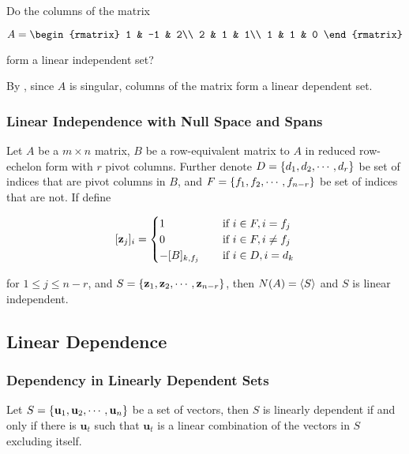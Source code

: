 \documentclass[a4paper,12pt]{article}
\begin{document}
\begin{exm}
  Do the columns of the matrix

  $$A=\begin{rmatrix}
    1 & -1 & 2\\
    2 & 1 & 1\\
    1 & 1 & 0
  \end{rmatrix}$$\s

  form a linear independent set?\n

  \ans By \rthm[\sctd{2}], since $A$ is singular, columns of the matrix form a linear dependent set.
\end{exm}

\subsubsection{Linear Independence with Null Space and Spans}
\begin{thm}
  Let $A$ be a $m\times n$ matrix, $B$ be a row-equivalent matrix to $A$ in reduced row-echelon form with $r$ pivot columns. Further denote $D=\left\{ d_{1},d_{2},\cdots,d_{r}\right\}$ be set of indices that are pivot columns in $B$, and $F=\left\{ f_{1},f_{2},\cdots,f_{n-r}\right\}$ be set of indices that are not. If define

  $$[\mathbf{z}_{j}]_{i}=\begin{cases}
    1&\;\;\;\;\text{if }i\in F,i=f_{j}\\
    0&\;\;\;\;\text{if }i\in F,i\neq f_{j}\\
    -[B]_{k,f_{j}}&\;\;\;\;\text{if }i\in D,i=d_{k}
  \end{cases}$$\s

  for $1\leq j\leq n-r$, and $S=\left\{ \mathbf{z}_{1},\mathbf{z}_{2},\cdots,\mathbf{z}_{n-r}\right\}$, then $N(A)=\left\langle S\right\rangle$ and $S$ is linear independent.
\end{thm}

\subsection{Linear Dependence}
\subsubsection{Dependency in Linearly Dependent Sets}
\begin{thm}
  Let $S=\left\{ \mathbf{u}_{1},\mathbf{u}_{2},\cdots,\mathbf{u}_{n}\right\}$ be a set of vectors, then $S$ is linearly dependent if and only if there is $\mathbf{u}_{t}$ such that $\mathbf{u}_{t}$ is a linear combination of the vectors in $S$ excluding itself.
\end{thm}
\end{document}
